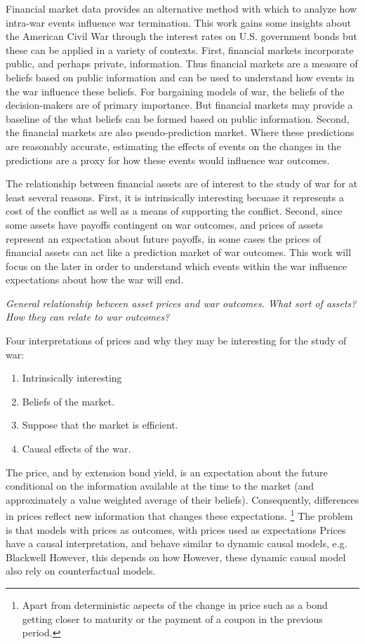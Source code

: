 Financial market data provides an alternative method with which to analyze how intra-war events influence war termination.
This work gains some insights about the American Civil War through the interest rates on U.S. government bonds but these can be applied in a variety of contexts.
First, financial markets incorporate public, and perhaps private, information.
Thus financial markets are a measure of beliefs based on public information and can be used to understand how events in the war influence these beliefs.
For bargaining models of war, the beliefs of the decision-makers are of primary importance.
But financial markets may provide a baseline of the what beliefs can be formed based on public information.
Second, the financial markets are also pseudo-prediction market.
Where these predictions are reasonably accurate, estimating the effects of events on the changes in the predictions are a proxy for how these events would influence war outcomes.

The relationship between financial assets are of interest to the study of war for at least several reasons.
First, it is intrinsically interesting becuase it represents a cost of the conflict as well as a means of supporting the conflict.
Second, since some assets have payoffs contingent on war outcomes, and prices of assets represent an expectation about future payoffs, in some cases the prices of financial assets can act like a prediction market of war outcomes.
This work will focus on the later in order to understand which events within the war influence expectations about how the war will end.



\textit{General relationship between asset prices and war outcomes. What sort of assets? How they can relate to war outcomes?}


Four interpretations of prices and why they may be interesting for the study of war:

\begin{enumerate}
\item Intrinsically interesting
\item Beliefs of the market.
\item Suppose that the market is efficient.
\item Causal effects of the war.
\end{enumerate}

The price, and by extension bond yield, is an expectation about the future conditional on the information available at the time to the market (and approximately a value weighted average of their beliefs).
Consequently, differences in prices reflect new information that changes these expectations.%
\footnote{Apart from deterministic aspects of the change in price such as a bond getting closer to maturity or the payment of a coupon in the previous period.}
The problem is that models with prices as outcomes, with prices used as expectations
Prices have a causal interpretation, and behave similar to dynamic causal models, e.g. Blackwell
However, this depends on how
However, these dynamic causal model also rely on counterfactual models.

